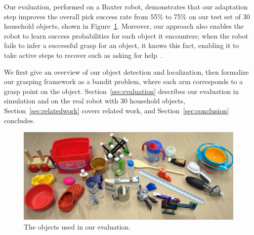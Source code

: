 \documentclass{article}
\begin{document}


Our evaluation, performed on a Baxter robot, demonstrates that our
adaptation step improves the overall pick success rate from 55\% to
75\% on our test set of 30 household objects, shown in
Figure~\ref{fig:object_glory_shot}.  Moreover, our approach also
enables the robot to learn success probabilities for each object it
encounters; when the robot fails to infer a successful grasp for an
object, it knows this fact, enabling it to take active steps to
recover such as asking for help~\citep{tellex14}.

We first give an overview of our object detection and localization,
then formalize our grasping framework as a bandit problem, where each
arm corresponds to a grasp point on the object.
Section~\ref{sec:evaluation} describes our evaluation in simulation
and on the real robot with $30$ household objects,
Section~\ref{sec:relatedwork} covers related work, and
Section~\ref{sec:conclusion} concludes.

\begin{figure}
\includegraphics[width=1\linewidth]{figures/object_glory_shot.jpg}
\caption{The objects used in our evaluation.\label{fig:object_glory_shot}}
\end{figure}
\end{document}
